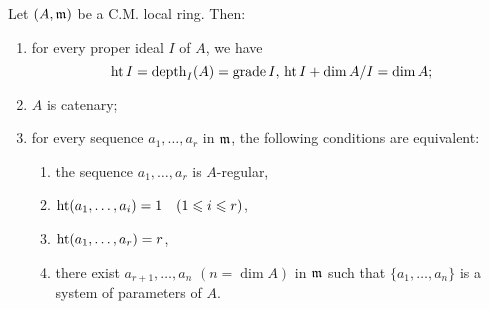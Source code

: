 \documentclass[../main]{subfiles}
\begin{document}
\begin{partheorem}\label{thm:031}
Let $(A, \mathfrak{m})$ be a C.M. local ring. Then:
\begin{enumerate}[label=\roman*)]
    \item for every proper ideal $I$ of $A$, we have \[\operatorname{ht} I=\operatorname{depth}_I(A)=\operatorname{grade} I,\, \operatorname{ht} I+\operatorname{dim} A / I=\operatorname{dim} A;\]
    \item $A$ is catenary;
    \item for every sequence $a_1, \ldots, a_r$ in $\mathfrak{m}$, the following conditions are equivalent:
    \begin{enumerate}[label=(\arabic*)]
        \item the sequence $a_1, \ldots, a_r$ is $A$-regular,
        \item $\Ht (a_1, \ldots, a_i)=1\for{1 \leqslant i \leqslant r}$,
        \item $\operatorname{ht}(a_1, \dots, a_r)=r$,
        \item there exist $a_{r+1}, \ldots, a_n$ $(n=\dim A)$ in $\mathfrak{m}$ such that $\{a_1, \ldots, a_n\}$ is a system of parameters of $A$.
    \end{enumerate}
\end{enumerate}
\end{partheorem}
\end{document}
